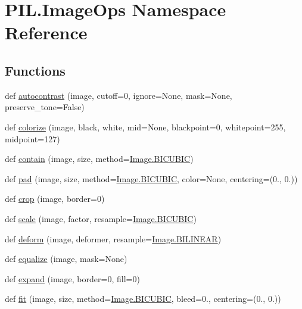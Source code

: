 \hypertarget{namespacePIL_1_1ImageOps}{}\section{P\+I\+L.\+Image\+Ops Namespace Reference}
\label{namespacePIL_1_1ImageOps}
\subsection*{Functions}
\begin{DoxyCompactItemize}
\item 
def \hyperlink{namespacePIL_1_1ImageOps_afe76c6114e2b0f82a03f4654a5267574}{autocontrast} (image, cutoff=0, ignore=None, mask=None, preserve\+\_\+tone=False)
\item 
def \hyperlink{namespacePIL_1_1ImageOps_af203d817228bf42ae085f1a90d65b317}{colorize} (image, black, white, mid=None, blackpoint=0, whitepoint=255, midpoint=127)
\item 
def \hyperlink{namespacePIL_1_1ImageOps_a936e452e4388ae6b0cf19ff6881d562e}{contain} (image, size, method=\hyperlink{namespacePIL_1_1Image_a3824ac5a0532aa60f7072af889d88e59}{Image.\+B\+I\+C\+U\+B\+IC})
\item 
def \hyperlink{namespacePIL_1_1ImageOps_ab6b83ba1edb453e1fa135e996035817b}{pad} (image, size, method=\hyperlink{namespacePIL_1_1Image_a3824ac5a0532aa60f7072af889d88e59}{Image.\+B\+I\+C\+U\+B\+IC}, color=None, centering=(0., 0.))
\item 
def \hyperlink{namespacePIL_1_1ImageOps_a97f0cbbea442db0681e45c7b64395a6d}{crop} (image, border=0)
\item 
def \hyperlink{namespacePIL_1_1ImageOps_abd1f30ecd4e0780752fb7b161ea36bc9}{scale} (image, factor, resample=\hyperlink{namespacePIL_1_1Image_a3824ac5a0532aa60f7072af889d88e59}{Image.\+B\+I\+C\+U\+B\+IC})
\item 
def \hyperlink{namespacePIL_1_1ImageOps_a0807122504af438786dd05e716c357b8}{deform} (image, deformer, resample=\hyperlink{namespacePIL_1_1Image_ad4b661d0dee54be6240599760dcf45c8}{Image.\+B\+I\+L\+I\+N\+E\+AR})
\item 
def \hyperlink{namespacePIL_1_1ImageOps_a1a95dfa2e8119aac5eb69f1d83dc63b5}{equalize} (image, mask=None)
\item 
def \hyperlink{namespacePIL_1_1ImageOps_a2d9d10f23a0b211caa54efef496aa3eb}{expand} (image, border=0, fill=0)
\item 
def \hyperlink{namespacePIL_1_1ImageOps_a335558444f171870d2a9ab53c1aab5b9}{fit} (image, size, method=\hyperlink{namespacePIL_1_1Image_a3824ac5a0532aa60f7072af889d88e59}{Image.\+B\+I\+C\+U\+B\+IC}, bleed=0., centering=(0., 0.))

\end{DoxyCompactItemize}
